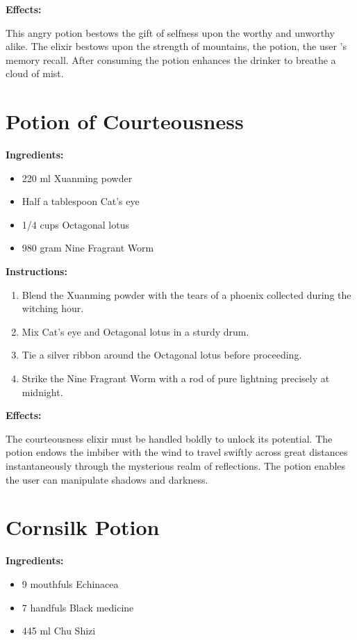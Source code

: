 \documentclass{article}
\begin{document}
\textbf{Effects:}

This angry potion bestows the gift of selfness upon the worthy and unworthy alike. The elixir bestows upon the strength of mountains, the potion, the user 's memory recall. After consuming the potion enhances the drinker to breathe a cloud of mist.

\newpage
\section*{Potion of Courteousness}

\textbf{Ingredients:}

\begin{itemize}
  \item 220 ml Xuanming powder
  \item Half a tablespoon Cat's eye
  \item 1/4 cups Octagonal lotus
  \item 980 gram Nine Fragrant Worm
\end{itemize}

\textbf{Instructions:}

\begin{enumerate}
  \item Blend the Xuanming powder with the tears of a phoenix collected during the witching hour.
  \item Mix Cat's eye and Octagonal lotus in a sturdy drum.
  \item Tie a silver ribbon around the Octagonal lotus before proceeding.
  \item Strike the Nine Fragrant Worm with a rod of pure lightning precisely at midnight.
\end{enumerate}

\textbf{Effects:}

The courteousness elixir must be handled boldly to unlock its potential. The potion endows the imbiber with the wind to travel swiftly across great distances instantaneously through the mysterious realm of reflections. The potion enables the user can manipulate shadows and darkness.

\newpage
\section*{Cornsilk Potion}

\textbf{Ingredients:}

\begin{itemize}
  \item 9 mouthfuls Echinacea
  \item 7 handfuls Black medicine
  \item 445 ml Chu Shizi
\end{itemize}
\end{document}
